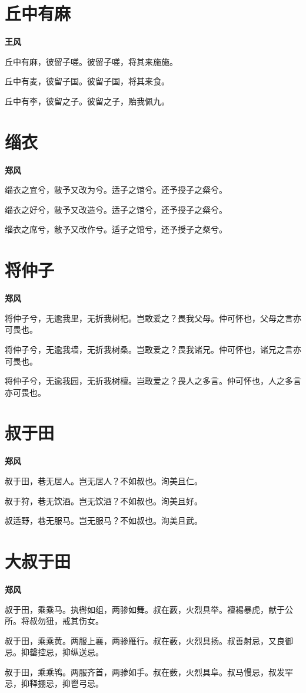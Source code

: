 \documentclass[12pt,a4paper]{ctexbook}
\begin{document}
\section{丘中有麻}
\textbf{王风}\par\vspace{0.5em}
丘中有麻，彼留子嗟。彼留子嗟，将其来施施。\par
丘中有麦，彼留子国。彼留子国，将其来食。\par
丘中有李，彼留之子。彼留之子，贻我佩九。\par

\section{缁衣}
\textbf{郑风}\par\vspace{0.5em}
缁衣之宜兮，敝予又改为兮。适子之馆兮。还予授子之粲兮。\par
缁衣之好兮，敝予又改造兮。适子之馆兮，还予授子之粲兮。\par
缁衣之席兮，敝予又改作兮。适子之馆兮，还予授子之粲兮。\par

\section{将仲子}
\textbf{郑风}\par\vspace{0.5em}
将仲子兮，无逾我里，无折我树杞。岂敢爱之？畏我父母。仲可怀也，父母之言亦可畏也。\par
将仲子兮，无逾我墙，无折我树桑。岂敢爱之？畏我诸兄。仲可怀也，诸兄之言亦可畏也。\par
将仲子兮，无逾我园，无折我树檀。岂敢爱之？畏人之多言。仲可怀也，人之多言亦可畏也。\par

\section{叔于田}
\textbf{郑风}\par\vspace{0.5em}
叔于田，巷无居人。岂无居人？不如叔也。洵美且仁。\par
叔于狩，巷无饮酒。岂无饮酒？不如叔也。洵美且好。\par
叔适野，巷无服马。岂无服马？不如叔也。洵美且武。\par

\section{大叔于田}
\textbf{郑风}\par\vspace{0.5em}
叔于田，乘乘马。执辔如组，两骖如舞。叔在薮，火烈具举。襢裼暴虎，献于公所。将叔勿狃，戒其伤女。\par
叔于田，乘乘黄。两服上襄，两骖雁行。叔在薮，火烈具扬。叔善射忌，又良御忌。抑罄控忌，抑纵送忌。\par
叔于田，乘乘鸨。两服齐首，两骖如手。叔在薮，火烈具阜。叔马慢忌，叔发罕忌，抑释掤忌，抑鬯弓忌。\par
\end{document}
